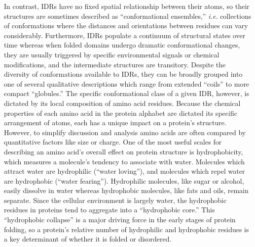 In contrast, IDRs have no fixed spatial relationship between their atoms, so their structures are sometimes described as ``conformational ensembles,'' \textit{i.e.} collections of conformations where the distances and orientations between residues can vary considerably. Furthermore, IDRs populate a continuum of structural states over time whereas when folded domains undergo dramatic conformational changes, they are usually triggered by specific environmental signals or chemical modifications, and the intermediate structures are transitory. Despite the diversity of conformations available to IDRs, they can be broadly grouped into one of several qualitative descriptions which range from extended ``coils'' to more compact ``globules.'' The specific conformational class of a given IDR, however, is dictated by its local composition of amino acid residues. Because the chemical properties of each amino acid in the protein alphabet are dictated its specific arrangement of atoms, each has a unique impact on a protein's structure. However, to simplify discussion and analysis amino acids are often compared by quantitative factors like size or charge. One of the most useful scales for describing an amino acid's overall effect on protein structure is hydrophobicity, which measures a molecule's tendency to associate with water. Molecules which attract water are hydrophilic (``water loving''), and molecules which repel water are hydrophobic (``water fearing''). Hydrophilic molecules, like sugar or alcohol, easily dissolve in water whereas hydrophobic molecules, like fats and oils, remain separate. Since the cellular environment is largely water, the hydrophobic residues in proteins tend to aggregate into a ``hydrophobic core.'' This ``hydrophobic collapse'' is a major driving force in the early stages of protein folding, so a protein's relative number of hydrophilic and hydrophobic residues is a key determinant of whether it is folded or disordered.

